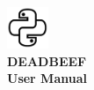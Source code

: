 \clearpage
\begin{titlepage}

\begin{center}
\includegraphics[height=1.25cm]{../includes/icon_main.png}\\
\vspace*{6cm}%
\textbf{\Huge DEADBEEF}\\
\vspace*{0.25cm}%
\textbf{\huge User Manual}\\
\vspace*{8.5cm}%
\end{center}

\begin{flushright}
	\mbox{\scriptsize
	
	}
\end{flushright}
\end{titlepage}